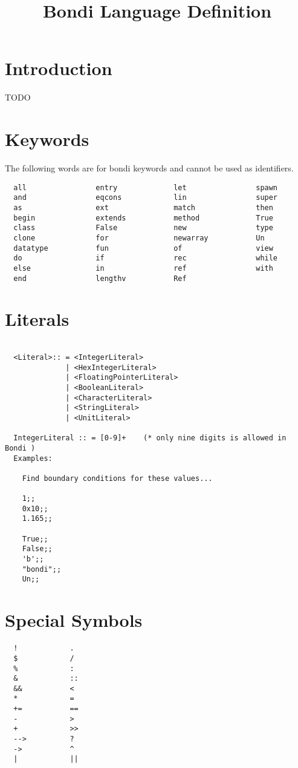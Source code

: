 \documentclass{article}
\begin{document}
\title{Bondi Language Definition}
\maketitle

\section{Introduction}
  TODO

\section{Keywords}

The following words are for bondi keywords and cannot be used as
identifiers.

\begin{verbatim}
  all                entry             let                spawn
  and                eqcons            lin                super
  as                 ext               match              then
  begin              extends           method             True
  class              False             new                type
  clone              for               newarray           Un
  datatype           fun               of                 view
  do                 if                rec                while
  else               in                ref                with
  end                lengthv           Ref
\end{verbatim}

\section{Literals}
\begin{verbatim}

  <Literal>:: = <IntegerLiteral>
              | <HexIntegerLiteral>
              | <FloatingPointerLiteral>
              | <BooleanLiteral>
              | <CharacterLiteral>
              | <StringLiteral>
              | <UnitLiteral>
  
  IntegerLiteral :: = [0-9]+    (* only nine digits is allowed in Bondi ) 
  Examples:

    Find boundary conditions for these values...

    1;; 
    0x10;;
    1.165;;

    True;;
    False;;  
    'b';;
    "bondi";;
    Un;;
\end{verbatim}

\section{Special Symbols}
\begin{verbatim}
  !            .
  $            /
  %            :
  &            ::
  &&           <
  *            =
  +=           ==
  -            >
  +            >>
  -->          ?
  ->           ^
  |            ||
\end{verbatim}
\end{document}
